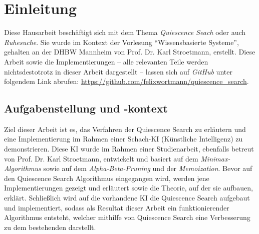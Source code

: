 
\chapter{Einleitung}
Diese Hausarbeit beschäftigt sich mit dem Thema \textit{Quiescence Seach} oder auch \textit{Ruhesuche}. Sie wurde im Kontext der Vorlesung "`Wissensbasierte Systeme"', gehalten an der DHBW Mannheim von Prof. Dr. Karl Stroetmann, erstellt. Diese Arbeit sowie die Implementierungen -- alle relevanten Teile werden nichtsdestotrotz in dieser Arbeit dargestellt -- lassen sich auf \textit{GitHub} unter folgendem Link abrufen: \url{https://github.com/felixwortmann/quiescence_search}.

\section{Aufgabenstellung und -kontext}
Ziel dieser Arbeit ist es, das Verfahren der Quiescence Search zu erläutern und eine Implementierung im Rahmen einer Schach-KI (Künstliche Intelligenz) zu demonstrieren. Diese KI wurde im Rahmen einer Studienarbeit, ebenfalls betreut von Prof. Dr. Karl Stroetmann, entwickelt und basiert auf dem \textit{Minimax-Algorithmus} sowie auf dem \textit{Alpha-Beta-Pruning} und der \textit{Memoization}. Bevor auf den Quiescence Search Algorithmus eingegangen wird, werden jene Implementierungen gezeigt und erläutert sowie die Theorie, auf der sie aufbauen, erklärt. Schließlich wird auf die vorhandene KI die Quiescence Search aufgebaut und implementiert, sodass als Resultat dieser Arbeit ein funktionierender Algorithmus entsteht, welcher mithilfe von Quiescence Search eine Verbesserung zu dem bestehenden darstellt.